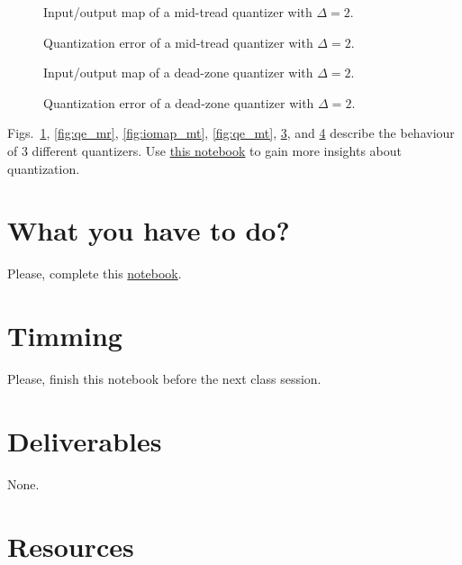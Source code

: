 \begin{figure}
  \centering
  \caption{Input/output map of a mid-tread quantizer with $\Delta=2$.}
  \label{fig:iomap_mr}
\end{figure}

\begin{figure}
  \centering
  \caption{Quantization error of a mid-tread quantizer with $\Delta=2$.}
  \label{fig:quantization_error_dz}
\end{figure}

\begin{figure}
  \centering
  \caption{Input/output map of a dead-zone quantizer with $\Delta=2$.}
  \label{fig:iomap_dz}
\end{figure}

\begin{figure}
  \centering
  \caption{Quantization error of a dead-zone quantizer with $\Delta=2$.}
  \label{fig:qe_dz}
\end{figure}

Figs.~\ref{fig:iomap_mr}, \ref{fig:qe_mr}, \ref{fig:iomap_mt},
\ref{fig:qe_mt}, \ref{fig:iomap_dz}, and \ref{fig:qe_dz} describe the
behaviour of 3 different quantizers.  Use
\href{https://github.com/Sistemas-Multimedia/Sistemas-Multimedia.github.io/blob/master/study_guide/05-quantization/digital_quantization.ipynb}{this
  notebook} to gain more insights about quantization.

\section{What you have to do?}
  
Please, complete this
\href{https://github.com/Sistemas-Multimedia/Sistemas-Multimedia.github.io/blob/master/study_guide/MDWT/MDWT.ipynb}{notebook}.

\section{Timming}

Please, finish this notebook before the next class session.

\section{Deliverables}

None.

\section{Resources}


